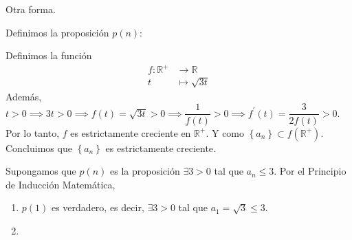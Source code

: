 \begin{frame}
    \begin{solution}
        Otra forma.

        \begin{description}[leftmargin=*] %
            \item[$a_{n}$ es estrictamente creciente.]

                Definimos la proposición $p\left(n\right)$:

                Definimos la función
                \begin{align*}
                    f\colon\mathbb{R}^{+} &
                    \longrightarrow\mathbb{R} \\
                    t                     &
                    \longmapsto\sqrt{3t}
                \end{align*}
                Además,
                \begin{math}
                    t>0\implies
                    3t>0\implies
                    f\left(t\right)=
                    \sqrt{3t}>0\implies
                    \dfrac{1}{f\left(t\right)}>0\implies
                    f^{\prime}\left(t\right)=
                    \dfrac{3}{2f\left(t\right)}>0.
                \end{math}
                Por lo tanto, $f$ es estrictamente creciente en
                $\mathbb{R}^{+}$.
                Y como
                \begin{math}
                    \left\{a_{n}\right\}\subset
                    f\left(\mathbb{R}^{+}\right)
                \end{math}.
                Concluimos que $\left\{a_{n}\right\}$ es
                estrictamente creciente.

            \item[$a_{n}$ es acotada superiormente.]

                Supongamos que $p\left(n\right)$ es la proposición
                $\exists 3>0$ tal que $a_{n}\leq 3$.
                Por el \alert{Principio de Inducción Matemática},

                \begin{enumerate}[(1)]
                    \item\label{hyp:5.1}

                    $p\left(1\right)$ es verdadero, es decir,
                    $\exists 3>0$ tal que $a_{1}=\sqrt{3}\leq 3$.

                    \item\label{hyp:5.2}


\end{enumerate}
\end{description}
\end{solution}
\end{frame}

